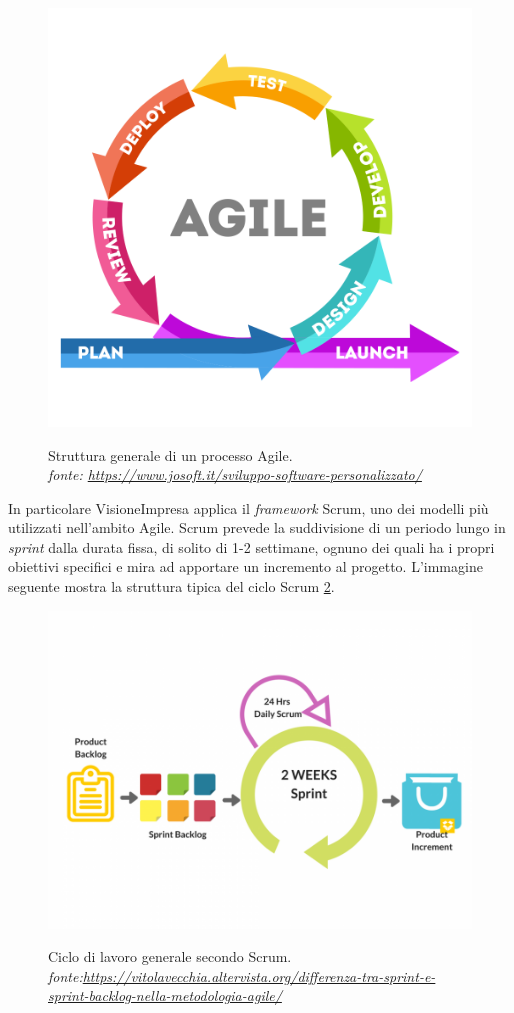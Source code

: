 \begin{figure}[H]
    \centering
    \includegraphics[alt={Agile}, width=.5\columnwidth]{thesis/files/img/metodo_agile.png}
    \caption[Struttura generale di un processo Agile.]{Struttura generale di un processo Agile. \\ \textit{fonte: \url{https://www.josoft.it/sviluppo-software-personalizzato/}}}
    \label{fig:Agile}
\end{figure} 

In particolare VisioneImpresa applica il \textit{framework} Scrum, uno dei modelli più utilizzati nell'ambito Agile. Scrum prevede la suddivisione di un periodo lungo in \textit{sprint} dalla durata fissa, di solito di 1-2 settimane, ognuno dei quali ha i propri obiettivi specifici e mira ad apportare un incremento al progetto.
L'immagine seguente mostra la struttura tipica del ciclo Scrum \ref{fig:Scrum}.

\begin{figure}[H]
    \centering
    \includegraphics[alt={Scrum}, width=1\columnwidth]{thesis/files/img/Differenza-tra-Sprint-e-Sprint-Backlog-nella-metodologia-Agile-960x720.png}
    \caption[Ciclo di lavoro generale secondo Scrum.]{Ciclo di lavoro generale secondo Scrum. \\ \textit{fonte:\url{https://vitolavecchia.altervista.org/differenza-tra-sprint-e-sprint-backlog-nella-metodologia-agile/}}}
    \label{fig:Scrum}
\end{figure} 

